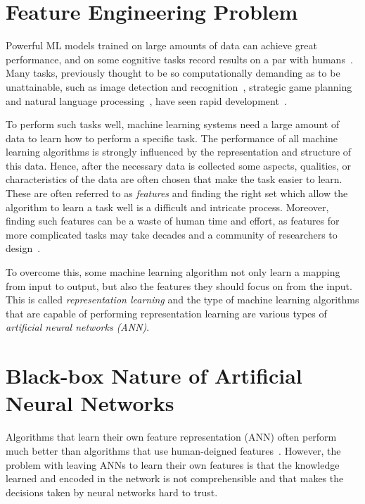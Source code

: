 \section{Feature Engineering Problem}
\label{featureeng}
Powerful ML models trained on large amounts of data can achieve great performance, and on some cognitive tasks record results on a par with humans~\cite{brown2017libratus, zhai2023can, silver2017mastering}. Many tasks, previously thought to be so computationally demanding as to be unattainable, such as image detection and recognition~\cite{HeZRS16}, strategic game planning~\cite{SilverHMGSDSAPL16} and natural language processing~\cite{DengHK13}, have seen rapid development~\cite{LeCunBH15}. 

To perform such tasks well, machine learning systems need a large amount of data to learn how to perform a specific task. The performance of all machine learning algorithms is strongly influenced by the representation and structure of this data. Hence, after the necessary data is collected some aspects, qualities, or characteristics of the data are often chosen that make the task easier to learn. These are often referred to as \textit{features} and finding the right set which allow the algorithm to learn a task well is a difficult and intricate process. Moreover, finding such features can be a waste of human time and effort, as features for more complicated tasks may take decades and a community of researchers to design~\cite{goodfellow2016deep}. 

To overcome this, some machine learning algorithm not only learn a mapping from input to output, but also the features they should focus on from the input. This is called \textit{representation learning} and the type of machine learning algorithms that are capable of performing representation learning are various types of \textit{artificial neural networks (ANN)}.  

\section{Black-box Nature of Artificial Neural Networks}

Algorithms that learn their own feature representation (\ie ANN) often perform much better than algorithms that use human-deigned features~\cite{goodfellow2016deep}. However, the problem with leaving ANNs to learn their own features is that the knowledge learned and encoded in the network is not comprehensible and that makes the decisions taken by neural networks hard to trust. 


